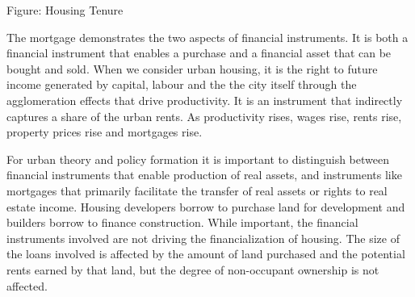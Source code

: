 Figure: Housing Tenure 

The mortgage demonstrates the two aspects of financial instruments. It is both a financial instrument that enables a purchase and a financial asset that can be bought and sold. When we consider urban housing, it is the right to future income generated by capital, labour and the the city itself through the agglomeration effects that drive productivity. It is an instrument that indirectly captures a share of the urban rents. As productivity rises, wages rise, rents rise, property prices rise and mortgages rise. 



For urban theory and policy formation it is important to distinguish between financial instruments that enable production of real assets, and instruments like  mortgages that primarily facilitate the transfer of real assets or rights to real estate  income. Housing developers borrow to purchase land for development and builders borrow to finance construction. While important, the financial instruments involved are not driving the financialization of housing.  The size of the loans involved is affected by the amount of land purchased and the potential rents earned by that land, but the degree of non-occupant ownership is not affected.

  
\begin{center}
\end{center}

